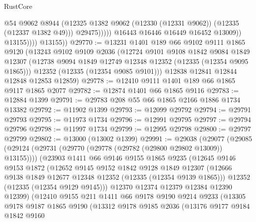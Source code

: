\begin{lexlean}{RustCore}
\begin{coremodule}
                              @54
                              @9062
                              @8944
                              (@12325
                                @1382
                                @9062
                                (@12330 (@12331 @9062))
                                (@12335 (@12337 @1382 @49)))
                              @29475)))))
                    @16443
                    @16446
                    @16449
                    @16452
                    @13009))
                @13155))))
        @13155))
@29770 := @13231
    @1401
    @189
    @66
    @9102
    @9111
    @1865
    @9120
    (@13243
      @9102
      @9109
      @2036
      (@12724
        @9101
        @9108
        @1842
        @9084
        @1849
        @12307
        (@12738 @9094 @1849 @12749 @12348 @12352 (@12335 (@12354 @9095 @1865)))
        @12352
        (@12335 (@12354 @9085 @9101)))
      @12838
      @12841
      @12844
      @12848
      @12853
      @12859)
@29778 := @12410 @9111 @1401 @189 @66 @1865 @9117 @1865 @2077
@29782 := @12874 @1401 @66 @1865 @9116
@29783 := @12884 @1399
@29791 := @29783 @208 @55 @66 @1865 @2166 @1886 @1734 @13382
@29792 := @11902 @1399
@29793 := @12099 @29792
@29794 := @29791 @29793
@29795 := @11973 @1734
@29796 := @12991 @29795
@29797 := @29794 @29796
@29798 := @11997 @1734
@29799 := @12995 @29798
@29800 := @29797 @29799
@29802 := @13000 (@13002 @1399)
@29991 := @29038
    (@29077
      (@29085
        (@29124 (@29731 (@29770 (@29778 (@29782 (@29800 @29802 @13009)) @13155))))
        (@23903
          @1411
          @66
          @9146
          @9155
          @1865
          @9235
          (@12645
            @9146
            @9153
            @1872
            (@12652
              @9145
              @9152
              @1842
              @9128
              @1849
              @12307
              (@12666 @9138 @1849 @12677 @12348 @12352 (@12335 (@12354 @9139 @1865)))
              @12352
              (@12335 (@12354 @9129 @9145)))
            @12370
            @12374
            @12379
            @12384
            @12390
            @12399)
          (@12410
            @9155
            @211
            @1411
            @66
            @9178
            @9190
            @9214
            @9233
            (@13305
              @9178
              @9187
              @1865
              @9190
              (@13312
                @9178
                @9185
                @2036
                (@13176
                  @9177
                  @9184
                  @1842
                  @9160

\end{coremodule}
\end{lexlean}
